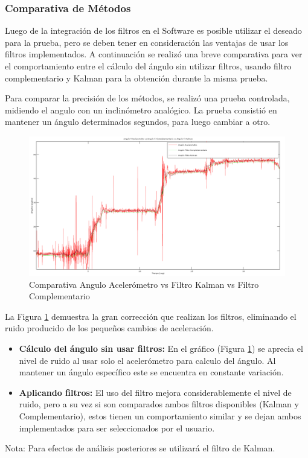 \documentclass[12pt,a4paper]{article}
\begin{document}
\subsubsection{Comparativa de Métodos}
Luego de la integración de los filtros en el Software es posible utilizar el deseado para la prueba, pero se deben tener en consideración las ventajas de usar los filtros implementados. A continuación se realizó una breve comparativa para ver el comportamiento entre el cálculo del ángulo sin utilizar filtros, usando filtro complementario y Kalman para la obtención durante la misma prueba.

\newpage 
Para comparar la precisión de los métodos, se realizó una prueba controlada, midiendo el angulo con un inclinómetro analógico. La prueba consistió en mantener un ángulo determinados segundos, para luego cambiar a otro.
\begin{figure}[H]
	\centering
	\includegraphics[scale=0.4]{images/angKalCom}
	\caption{Comparativa Angulo Acelerómetro vs Filtro Kalman vs Filtro Complementario}
	\label{fig:AnguloXvsFiltros}
\end{figure}

La Figura \ref{fig:AnguloXvsFiltros} demuestra la gran corrección que realizan los filtros, eliminando el ruido producido de los pequeños cambios de aceleración.
\begin{itemize}
	\item \textbf{Cálculo del ángulo sin usar filtros:} En el gráfico (Figura \ref{fig:AnguloXvsFiltros}) se aprecia el nivel de ruido al usar solo el acelerómetro para calculo del ángulo. Al mantener un ángulo específico este se encuentra en constante variación.
	\item \textbf{Aplicando filtros:} El uso del filtro mejora considerablemente el nivel de ruido, pero a su vez si son comparados ambos filtros disponibles (Kalman y Complementario), estos tienen un comportamiento similar y se dejan ambos implementados para ser seleccionados por el usuario.
\end{itemize}
Nota: Para efectos de análisis posteriores se utilizará el filtro de Kalman.
\end{document}
